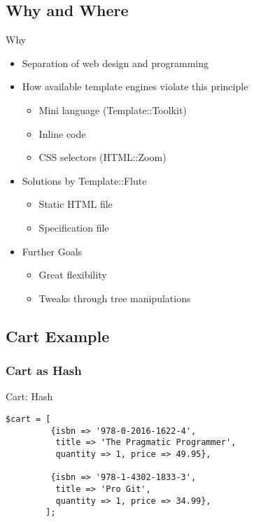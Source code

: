 \subsection{Why and Where}
\begin{frame}{Why}
  \begin{itemize}
  \item Separation of web design and programming
  \item How available template engines violate this principle
    \begin{itemize}
    \item Mini language (Template::Toolkit)
    \item Inline code
    \item CSS selectors (HTML::Zoom)
    \end{itemize}
  \item Solutions by Template::Flute
    \begin{itemize}
      \item Static HTML file
      \item Specification file
    \end{itemize}
  \item Further Goals
    \begin{itemize}
    \item Great flexibility
    \item Tweaks through tree manipulations
    \end{itemize}
  \end{itemize}
\end{frame}


\subsection{Cart Example}
\subsubsection{Cart as Hash}
\begin{frame}[fragile]{Cart: Hash}
\begin{lstlisting}
$cart = [
         {isbn => '978-0-2016-1622-4', 
          title => 'The Pragmatic Programmer',
          quantity => 1, price => 49.95},

         {isbn => '978-1-4302-1833-3',
          title => 'Pro Git',
          quantity => 1, price => 34.99},
		];
\end{lstlisting}
\end{frame}
